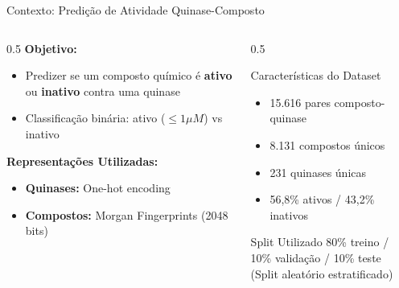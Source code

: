 \documentclass[aspectratio=169,11pt]{beamer}
\begin{document}
\begin{frame}{Contexto: Predição de Atividade Quinase-Composto}
    \begin{columns}
        \begin{column}{0.5\textwidth}
            \textbf{Objetivo:}
            \begin{itemize}
                \item Predizer se um composto químico é \textbf{ativo} ou \textbf{inativo} contra uma quinase
                \item Classificação binária: ativo ($\leq 1\mu M$) vs inativo
            \end{itemize}

            \vspace{0.5cm}
            \textbf{Representações Utilizadas:}
            \begin{itemize}
                \item \textbf{Quinases:} One-hot encoding
                \item \textbf{Compostos:} Morgan Fingerprints (2048 bits)
            \end{itemize}
        \end{column}
        \begin{column}{0.5\textwidth}
            \begin{block}{Características do Dataset}
                \begin{itemize}
                    \item 15.616 pares composto-quinase
                    \item 8.131 compostos únicos
                    \item 231 quinases únicas
                    \item 56,8\% ativos / 43,2\% inativos
                \end{itemize}
            \end{block}

            \vspace{0.3cm}
            \begin{block}{Split Utilizado}
                80\% treino / 10\% validação / 10\% teste\\
                (Split aleatório estratificado)
            \end{block}
        \end{column}
    \end{columns}
\end{frame}
\end{document}
